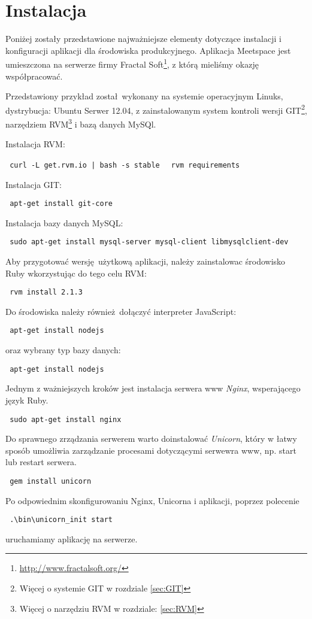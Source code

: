 \section{Instalacja}
Poniżej zostały przedstawione najważniejsze elementy dotyczące instalacji i konfiguracji aplikacji dla środowiska produkcyjnego. Aplikacja Meetspace jest umieszczona na serwerze firmy Fractal Soft\footnote{\url{http://www.fractalsoft.org/}}, z którą mieliśmy okazję współpracować.

Przedstawiony przykład został wykonany na systemie operacyjnym Linuks, dystrybucja: Ubuntu Serwer 12.04, z zainstalowanym system kontroli wersji GIT\footnote{Więcej o systemie GIT w rozdziale \ref{sec:GIT}}, narzędziem RVM\footnote{Więcej o narzędziu RVM w rozdziale: \ref{sec:RVM}} i bazą danych MySQl.

Instalacja RVM:
\begin{center}
  \texttt{ curl -L get.rvm.io | bash -s stable }
  \texttt{ rvm requirements }
\end{center}

Instalacja GIT:
\begin{center}
  \texttt{ apt-get install git-core }
\end{center}

Instalacja bazy danych MySQL:
\begin{center}
  \texttt{ sudo apt-get install mysql-server mysql-client libmysqlclient-dev }
\end{center}

Aby przygotować wersję użytkową aplikacji, należy zainstalowac środowisko Ruby wkorzystując do tego celu RVM:
\begin{center}
  \texttt{ rvm install 2.1.3 }
\end{center}
Do środowiska należy również dołączyć interpreter JavaScript:
\begin{center}
  \texttt{ apt-get install nodejs }
\end{center}
oraz wybrany typ bazy danych:
\begin{center}
  \texttt{ apt-get install nodejs }
\end{center}
\clearpage
Jednym z ważniejszych kroków jest instalacja serwera www \emph{Nginx}, wsperającego język Ruby.
\begin{center}
  \texttt{ sudo apt-get install nginx }
\end{center}

Do sprawnego zrządzania serwerem warto doinstalować \emph{Unicorn}, który w łatwy sposób umożliwia zarządzanie procesami dotyczącymi serwewra www, np. start lub restart serwera.
\begin{center}
  \texttt{ gem install unicorn }
\end{center}

Po odpowiednim skonfigurowaniu Nginx, Unicorna i aplikacji, poprzez polecenie
\begin{center}
  \texttt{ .\textbackslash{bin}\textbackslash{unicorn\_init} start }
\end{center}

uruchamiamy aplikację na serwerze.
